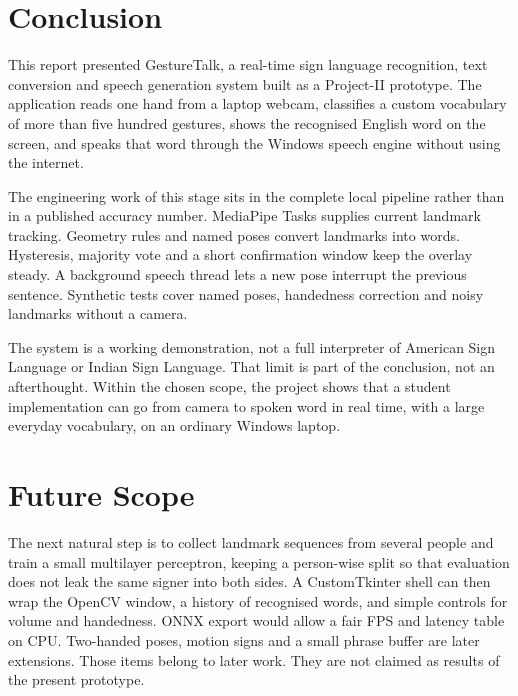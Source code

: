 \section{Conclusion}
This report presented GestureTalk, a real-time sign language recognition, text conversion and speech generation system built as a Project-II prototype. The application reads one hand from a laptop webcam, classifies a custom vocabulary of more than five hundred gestures, shows the recognised English word on the screen, and speaks that word through the Windows speech engine without using the internet.

The engineering work of this stage sits in the complete local pipeline rather than in a published accuracy number. MediaPipe Tasks supplies current landmark tracking. Geometry rules and named poses convert landmarks into words. Hysteresis, majority vote and a short confirmation window keep the overlay steady. A background speech thread lets a new pose interrupt the previous sentence. Synthetic tests cover named poses, handedness correction and noisy landmarks without a camera.

The system is a working demonstration, not a full interpreter of American Sign Language or Indian Sign Language. That limit is part of the conclusion, not an afterthought. Within the chosen scope, the project shows that a student implementation can go from camera to spoken word in real time, with a large everyday vocabulary, on an ordinary Windows laptop.

\section{Future Scope}
The next natural step is to collect landmark sequences from several people and train a small multilayer perceptron, keeping a person-wise split so that evaluation does not leak the same signer into both sides. A CustomTkinter shell can then wrap the OpenCV window, a history of recognised words, and simple controls for volume and handedness. ONNX export would allow a fair FPS and latency table on CPU. Two-handed poses, motion signs and a small phrase buffer are later extensions. Those items belong to later work. They are not claimed as results of the present prototype.
